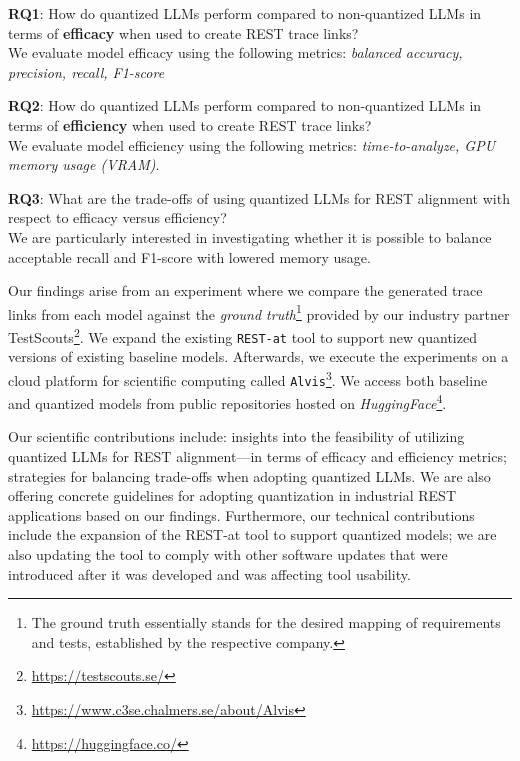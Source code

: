 \documentclass[conference]{IEEEtran}
\begin{document}
\begin{RQBox}
    \textbf{RQ1}: How do quantized LLMs perform compared to non-quantized LLMs
    in terms of \textbf{efficacy} when used to create REST trace links?\\[0.5em]
    We evaluate model efficacy using the following metrics: \textit{balanced accuracy, precision, recall, F1-score}
\end{RQBox}

\begin{RQBox}
    \textbf{RQ2}: How do quantized LLMs perform compared to non-quantized LLMs in
    terms of \textbf{efficiency} when used to create REST trace links? \\[0.5em]
    We evaluate model efficiency using the following metrics: \textit{time-to-analyze, GPU memory usage (VRAM)}.
\end{RQBox}

\begin{RQBox}
    \textbf{RQ3}: What are the trade-offs of using quantized LLMs for REST alignment
    with respect to efficacy versus efficiency? \\[0.5em]
    We are particularly interested in investigating whether it is possible to balance acceptable recall and F1-score with lowered memory usage.
\end{RQBox}

Our findings arise from an experiment where we compare the generated trace links from each model against the \textit{ground truth}\footnote{The ground truth essentially stands for the desired mapping of requirements and tests, established by the respective company.} provided by our industry partner TestScouts\footnote{\url{https://testscouts.se/}}. We expand the existing \verb|REST-at| tool to support new quantized versions of existing baseline models. Afterwards, we execute the experiments on a cloud platform for scientific computing called \verb|Alvis|\footnote{\url{https://www.c3se.chalmers.se/about/Alvis}}. We access both baseline and quantized models from public repositories hosted on \textit{HuggingFace}\footnote{\url{https://huggingface.co/}}.


Our scientific contributions include: insights into the feasibility of utilizing quantized LLMs for REST alignment---in terms of efficacy and efficiency metrics; strategies for balancing trade-offs  when adopting quantized LLMs. We are also offering concrete guidelines for adopting quantization in industrial REST applications based on our findings. %
Furthermore, our technical contributions include the expansion of the REST-at tool to support quantized models; we are also updating the tool to comply with other software updates that were introduced after it was developed and was affecting tool usability.
\end{document}
